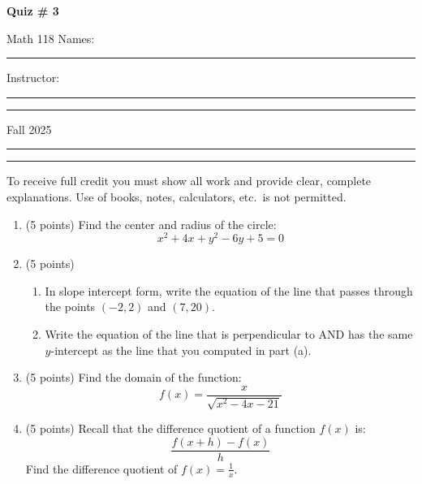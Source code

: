 \documentclass[11pt]{article}
\def\v{\vspace{11pt}}
\begin{document}
\centerline {\bf \large Quiz \# 3}
\v

\noindent Math 118 \hfill Names: \rule{2in}{.25mm}

\noindent Instructor: \rule{2in}{.25mm} \hfill \rule{2in}{.25mm}

\noindent Fall 2025 \hfill \rule{2in}{.25mm}

\hfill \rule{2in}{.25mm}

\v

\noindent To receive full credit you must show all work and provide clear, complete explanations.  Use of books, notes, calculators, etc.\ is not permitted.  

\begin{enumerate}
\item (5 points) Find the center and radius of the circle:
    \begin{equation*}
        x^2 + 4x + y^2 - 6y + 5 = 0
    \end{equation*}


\newpage

\item (5 points) 
\vspace{0.1in}
\begin{enumerate}
    \item In slope intercept form, write the equation of the line that passes through the points $(-2,2)$ and $(7,20)$. \vspace{3.5in}
    \item Write the equation of the line that is perpendicular to AND has the same $y$-intercept as the line that you computed in part (a).
\end{enumerate}

\vspace{4in}

\item (5 points) Find the domain of the function:
\begin{equation*}
    f(x) =  \frac{x}{\sqrt{x^2 - 4x-21}}
\end{equation*}

\newpage

\item (5 points) Recall that the difference quotient of a function $f(x)$ is:
\begin{equation*}
    \frac{f(x+h) - f(x)}{h}
\end{equation*}
Find the difference quotient of $\displaystyle f(x) = \frac{1}{x}$.
\end{enumerate}
\end{document}
